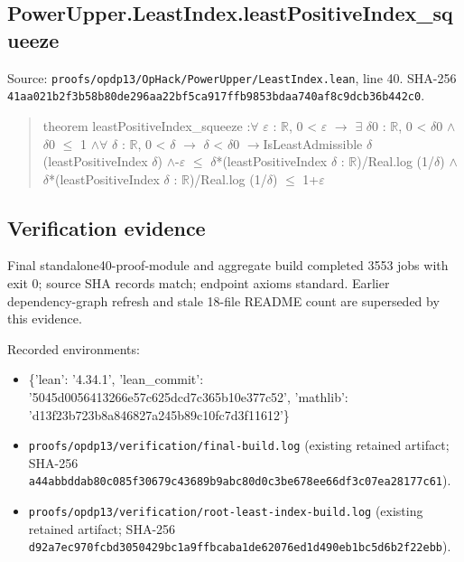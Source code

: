 \documentclass[11pt,a4paper]{article}
\begin{document}
\subsection{PowerUpper.LeastIndex.leastPositiveIndex\_squeeze}
Source: \texttt{proofs/opdp13/OpHack/PowerUpper/LeastIndex.lean}, line 40. SHA-256 \texttt{41aa021b2f3b58b80de296aa22bf5ca917ffb9853bdaa740af8c9dcb36b442c0}.

\begin{quote}\small\ttfamily theorem leastPositiveIndex\_squeeze :\newline \ensuremath{\forall} \ensuremath{\varepsilon} : \ensuremath{\mathbb{R}}, 0 < \ensuremath{\varepsilon} \ensuremath{\to} \ensuremath{\exists} \ensuremath{\delta}0 : \ensuremath{\mathbb{R}}, 0 < \ensuremath{\delta}0 \ensuremath{\wedge} \ensuremath{\delta}0 \ensuremath{\leq} 1 \ensuremath{\wedge}\newline \ensuremath{\forall} \ensuremath{\delta} : \ensuremath{\mathbb{R}}, 0 < \ensuremath{\delta} \ensuremath{\to} \ensuremath{\delta} < \ensuremath{\delta}0 \ensuremath{\to}\newline IsLeastAdmissible \ensuremath{\delta} (leastPositiveIndex \ensuremath{\delta}) \ensuremath{\wedge}-\ensuremath{\varepsilon} \ensuremath{\leq} \ensuremath{\delta}*(leastPositiveIndex \ensuremath{\delta} : \ensuremath{\mathbb{R}})/Real.log (1/\ensuremath{\delta}) \ensuremath{\wedge}\newline \ensuremath{\delta}*(leastPositiveIndex \ensuremath{\delta} : \ensuremath{\mathbb{R}})/Real.log (1/\ensuremath{\delta}) \ensuremath{\leq} 1+\ensuremath{\varepsilon}\end{quote}
\subsection{Verification evidence}
Final standalone40-proof-module and aggregate build completed 3553 jobs with exit 0; source SHA records match; endpoint axioms standard. Earlier dependency-graph refresh and stale 18-file README count are superseded by this evidence.

Recorded environments:

\begin{itemize}
\item \{'lean': '4.34.1', 'lean\_commit': '5045d0056413266e57c625dcd7c365b10e377c52', 'mathlib': 'd13f23b723b8a846827a245b89c10fc7d3f11612'\}
\end{itemize}
\begin{itemize}
\item \texttt{proofs/opdp13/verification/final-build.log} (existing retained artifact; SHA-256 \texttt{a44abbddab80c085f30679c43689b9abc80d0c3be678ee66df3c07ea28177c61}).
\end{itemize}
\begin{itemize}
\item \texttt{proofs/opdp13/verification/root-least-index-build.log} (existing retained artifact; SHA-256 \texttt{d92a7ec970fcbd3050429bc1a9ffbcaba1de62076ed1d490eb1bc5d6b2f22ebb}).
\end{itemize}
\clearpage
\end{document}
